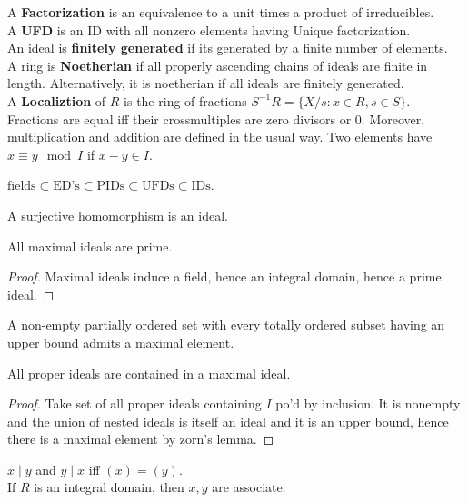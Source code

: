 \begin{definition}[Rings]
	A \textbf{Factorization} is an equivalence to a unit times a product of irreducibles.\\
	A \textbf{UFD} is an ID with all nonzero elements having Unique factorization.\\
	An ideal is \textbf{finitely generated} if its generated by a finite number of elements.\\
	A ring is \textbf{Noetherian} if all properly ascending chains of ideals are finite in length. Alternatively, it is noetherian if all ideals are finitely generated.\\
	A \textbf{Localiztion} of \(R\) is the ring of fractions \(S^{-1} R = \{X / s : x \in R, s \in S\} \). Fractions are equal iff their crossmultiples are zero divisors or \(0\). Moreover, multiplication and addition are defined in the usual way.
	Two elements have \(x \equiv y \mod I\) if \(x - y \in I\).
\end{definition}
\begin{theorem}
	\(\text{fields} \subset \text{ED's} \subset \text{PIDs} \subset \text{UFDs} \subset \text{IDs}\).
\end{theorem}
\begin{proposition}
	A surjective homomorphism is an ideal.
\end{proposition}
\begin{theorem}
	All maximal ideals are prime.
\end{theorem}
\begin{proof}
	Maximal ideals induce a field, hence an integral domain, hence a prime ideal.
\end{proof}
\begin{definition}
A non-empty partially ordered set with every totally ordered subset having an upper bound admits a maximal element.
\end{definition}
\begin{theorem}
All proper ideals are contained in a maximal ideal.
\end{theorem}
\begin{proof}
	Take set of all proper ideals containing \(I\) po'd by inclusion. It is nonempty and the union of nested ideals is itself an ideal and it is an upper bound, hence there is a maximal element by zorn's lemma.
\end{proof}
\begin{proposition}
	\(x \mid y\) and \(y \mid x\) iff \(\left( x \right)  = \left( y \right) \).\\
	If \(R\) is an integral domain, then \(x, y \)  are associate.
\end{proposition}
